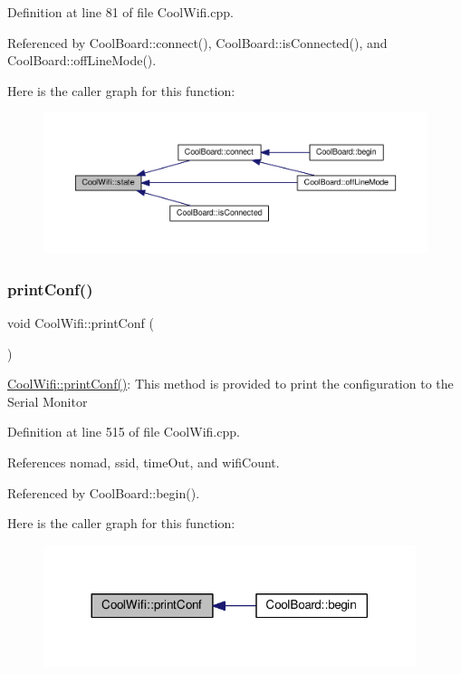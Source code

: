 Definition at line 81 of file Cool\+Wifi.\+cpp.



Referenced by Cool\+Board\+::connect(), Cool\+Board\+::is\+Connected(), and Cool\+Board\+::off\+Line\+Mode().

Here is the caller graph for this function\+:
\nopagebreak
\begin{figure}[H]
\begin{center}
\leavevmode
\includegraphics[width=350pt]{d7/d29/class_cool_wifi_a1c7b4d82a4098d346e7593dce92039fa_icgraph}
\end{center}
\end{figure}
\mbox{\label{class_cool_wifi_a9e6105c6d13d35ec510f6633da9e0223}} 
\subsubsection{\texorpdfstring{print\+Conf()}{printConf()}}
{\footnotesize\ttfamily void Cool\+Wifi\+::print\+Conf (\begin{DoxyParamCaption}{ }\end{DoxyParamCaption})}

\hyperlink{class_cool_wifi_a9e6105c6d13d35ec510f6633da9e0223}{Cool\+Wifi\+::print\+Conf()}\+: This method is provided to print the configuration to the Serial Monitor 

Definition at line 515 of file Cool\+Wifi.\+cpp.



References nomad, ssid, time\+Out, and wifi\+Count.



Referenced by Cool\+Board\+::begin().

Here is the caller graph for this function\+:
\nopagebreak
\begin{figure}[H]
\begin{center}
\leavevmode
\includegraphics[width=308pt]{d7/d29/class_cool_wifi_a9e6105c6d13d35ec510f6633da9e0223_icgraph}
\end{center}
\end{figure}
\mbox{\label{class_cool_wifi_a914d7a1df14dd6b75345fb614c34e9d6}} 
